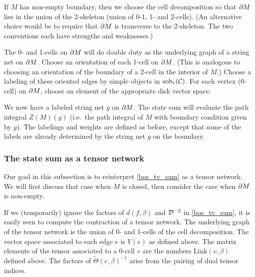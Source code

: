 \medskip

If $M$ has non-empty boundary,
then we choose the cell decomposition so that $\partial M$ lies in the union of the 2-skeleton (union of 0-1, 1- and 2-cells).
(An alternative choice would be to require that $\partial M$ is transverse to the 2-skeleton.
The two conventions each have strengths and weaknesses.)

The 0- and 1-cells on $\partial M$ will do double duty as the underlying graph of a string net on $\partial M$.
Choose an orientation of each 1-cell on $\partial M$.
(This is analogous to choosing an orientation of the boundary of a 2-cell in the interior of $M$.)
Choose a labeling of these oriented edges by simple objects in $\text{sob}_r(\mathcal{C})$.
For each vertex (0-cell) on $\partial M$, choose an element of the appropriate disk vector space.

We now have a labeled string net $g$ on $\partial M$.
The state sum will evaluate the path integral $Z(M)(g)$ 
(i.e.\ the path integral of $M$ with boundary condition given by $g$).
The labelings and weights are defined as before, except that some of the labels are already determined by the string net $g$ on the boundary.


\subsubsection{The state sum as a tensor network}

Our goal in this subsection is to reinterpret \eqref{bos_tv_sum} as a tensor network.
We will first discuss that case when $M$ is closed, then consider the case when $\partial M$ is non-empty.

\medskip

If we (temporarily) ignore the factors of $d(f, \beta)$ and $\mathcal{D}^{-2}$ in \eqref{bos_tv_sum}, 
it is easily seen to compute the contraction of a tensor network.
The underlying graph of the tensor network is the union of 0- and 1-cells of the cell decomposition.
The vector space associated to each edge $e$ is $V(e)$ as defined above.
The matrix elements of the tensor associated to a 0-cell $v$ are the numbers $\text{Link}(v, \beta)$ defined above.
The factors of $\widetilde\Theta(e, \beta)^{-1}$ arise from the pairing of dual tensor indices.

